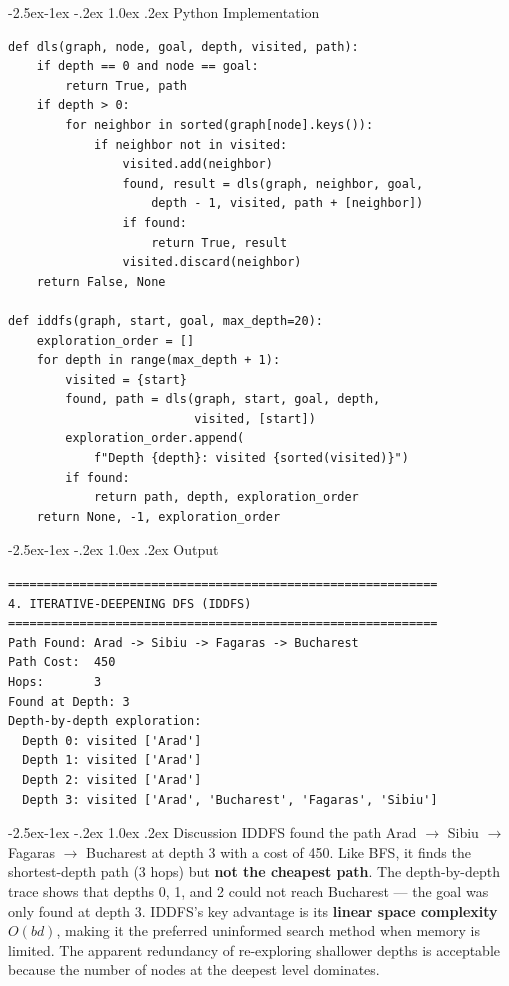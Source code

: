 \documentclass[12pt,a4paper]{article}
\makeatletter
\renewcommand{\subsection}{\@startsection{subsection}{2}{\z@}%
  {-2.5ex\@plus -1ex \@minus -.2ex}%
  {1.0ex \@plus .2ex}%
  {\normalfont\large\bfseries\color{accentblue}}}
\makeatother
\begin{document}
\subsection{Python Implementation}
\begin{lstlisting}[style=python, caption={Iterative-Deepening DFS}]
def dls(graph, node, goal, depth, visited, path):
    if depth == 0 and node == goal:
        return True, path
    if depth > 0:
        for neighbor in sorted(graph[node].keys()):
            if neighbor not in visited:
                visited.add(neighbor)
                found, result = dls(graph, neighbor, goal,
                    depth - 1, visited, path + [neighbor])
                if found:
                    return True, result
                visited.discard(neighbor)
    return False, None

def iddfs(graph, start, goal, max_depth=20):
    exploration_order = []
    for depth in range(max_depth + 1):
        visited = {start}
        found, path = dls(graph, start, goal, depth,
                          visited, [start])
        exploration_order.append(
            f"Depth {depth}: visited {sorted(visited)}")
        if found:
            return path, depth, exploration_order
    return None, -1, exploration_order
\end{lstlisting}

\subsection{Output}
\begin{lstlisting}[style=output, caption={IDDFS output}]
============================================================
4. ITERATIVE-DEEPENING DFS (IDDFS)
============================================================
Path Found: Arad -> Sibiu -> Fagaras -> Bucharest
Path Cost:  450
Hops:       3
Found at Depth: 3
Depth-by-depth exploration:
  Depth 0: visited ['Arad']
  Depth 1: visited ['Arad']
  Depth 2: visited ['Arad']
  Depth 3: visited ['Arad', 'Bucharest', 'Fagaras', 'Sibiu']
\end{lstlisting}

\subsection{Discussion}
IDDFS found the path Arad $\rightarrow$ Sibiu $\rightarrow$ Fagaras $\rightarrow$ Bucharest at depth 3 with a cost of 450. Like BFS, it finds the shortest-depth path (3 hops) but \textbf{not the cheapest path}. The depth-by-depth trace shows that depths 0, 1, and 2 could not reach Bucharest --- the goal was only found at depth 3. IDDFS's key advantage is its \textbf{linear space complexity} $O(bd)$, making it the preferred uninformed search method when memory is limited. The apparent redundancy of re-exploring shallower depths is acceptable because the number of nodes at the deepest level dominates.
\end{document}
